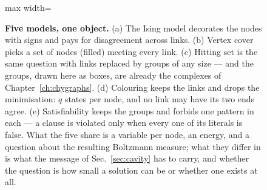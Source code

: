 \begin{figure}[t]
\begin{adjustbox}{max width=\linewidth}
\end{adjustbox}
\caption{\textbf{Five models, one object.} (a) The Ising model decorates the
nodes with signs and pays for disagreement across links. (b) Vertex cover picks
a set of nodes (filled) meeting every link. (c) Hitting set is the same question
with links replaced by groups of any size --- and the groups, drawn here as
boxes, are already the complexes of Chapter~\ref{ch:chygraphs}. (d) Colouring
keeps the links and drops the minimisation: $q$ states per node, and no link may
have its two ends agree. (e) Satisfiability keeps the groups and forbids one
pattern in each --- a clause is violated only when every one of its literals is
false. What the five share is a variable per node, an energy, and a question
about the resulting Boltzmann measure; what they differ in is what the message
of Sec.~\ref{sec:cavity} has to carry, and whether the question is how small a
solution can be or whether one exists at all.}
\label{fig:models}
\end{figure}

